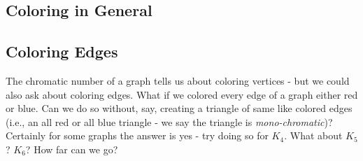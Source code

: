 \documentclass[12pt]{article}
\begin{document}
\subsection{Coloring in General}
%
%
%
%  
%
%


\subsection{Coloring Edges}


The chromatic number of a graph tells us about coloring vertices - but we could also ask about coloring edges.  What if we colored every edge of a graph either red or blue.  Can we do so without, say, creating a triangle of same like colored edges (i.e., an all red or all blue triangle - we say the triangle is {\em mono-chromatic})?  Certainly for some graphs the answer is yes - try doing so for $K_4$.  What about $K_5$?  $K_6$?  How far can we go?  
\end{document}
